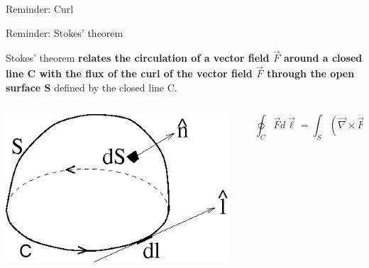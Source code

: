 {\begin{frame}{Reminder: Curl}
\end{frame}

%
%
%

\begin{frame}{Reminder: Stokes' theorem}

Stokes' theorem {\bf relates
the circulation of a vector field $\vec{F}$ around a closed line C
with the flux of the curl of the vector field $\vec{F}$ through the open surface S} defined by the closed line C.\\

\vspace{0.5cm}

\begin{columns}
  \begin{column}{0.45\textwidth}
   \begin{center}
     \includegraphics[width=0.95\textwidth]{./images/schematics/stokes_theorem_C.png}
   \end{center}
  \end{column}
  \begin{column}{0.45\textwidth}
  {\Large
    \begin{equation*}
      \oint_{C} \vec{F} d\vec{\ell} = \int_{S} (\vec{\nabla} \times \vec{F}) d\vec{S}
    \end{equation*}
  }
  \end{column}
\end{columns}

\end{frame}

} %

%
%
%

